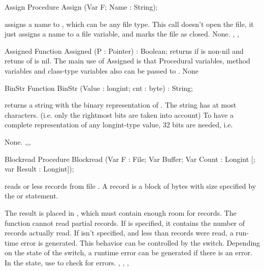 \begin{procedure}{Assign}
\Declaration
Procedure Assign (Var F; Name : String);

\Description
{} assigns a name to , which can be any file type.
This call doesn't open the file, it just assigns a name to a file variable,
and marks the file as closed.
\Errors
None.
\SeeAlso
{}, , 
\end{procedure}


\begin{function}{Assigned}
\Declaration
Function Assigned (P : Pointer) : Boolean;
\Description
{} returns  if  is non-nil
and retuns  of  is nil.
The main use of Assigned is that Procedural variables, method variables and
class-type variables also can be passed to .
\Errors
None
\SeeAlso
{}
\end{function}


\begin{function}{BinStr}
\Declaration
Function BinStr (Value : longint; cnt : byte) : String;

\Description
{} returns a string with the binary representation
of . The string has at most  characters.
(i.e. only the  rightmost bits are taken into account)
To have a complete representation of any longint-type value, 32
bits are needed, i.e. 

\Errors
None.
\SeeAlso
{},,, 
\end{function}


\begin{procedure}{Blockread}
\Declaration
Procedure Blockread (Var F : File; Var Buffer; Var Count : Longint [; var
Result : Longint]);

\Description
{} reads  or less records from file . A
record is a block of bytes with size specified by the  or
 statement.

The result is placed in , which must contain enough room for
 records. The function cannot read partial records.
If  is specified, it contains the number of records actually
read. If  isn't specified, and less than  records were
read, a run-time error is generated. This behavior can be controlled by the
 switch.
\Errors
Depending on the state of the  switch, a runtime error can be 
generated if there is an error. In the  state, use 
to check for errors.
\SeeAlso
{}, , , 
\end{procedure}

